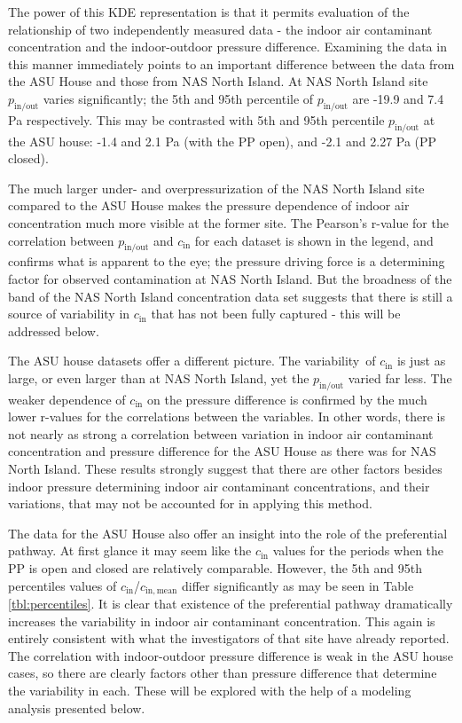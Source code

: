 \documentclass[preprint,12pt]{elsarticle}
\begin{document}
The power of this KDE representation is that it permits evaluation of the relationship of two independently measured data - the indoor air contaminant concentration and the indoor-outdoor pressure difference.
Examining the data in this manner immediately points to an important difference between the data from the ASU House and those from NAS North Island.
At NAS North Island site $p_\mathrm{in/out}$ varies significantly; the 5th and 95th percentile of $p_\mathrm{in/out}$ are -19.9 and 7.4 Pa respectively.
This may be contrasted with 5th and 95th percentile $p_\mathrm{in/out}$ at the ASU house: -1.4 and 2.1 Pa (with the PP open), and -2.1 and 2.27 Pa (PP closed).\par

The much larger under- and overpressurization of the NAS North Island site compared to the ASU House makes the pressure dependence of indoor air concentration much more visible at the former site.
The Pearson’s r-value for the correlation between $p_\mathrm{in/out}$ and $c_\mathrm{in}$ for each dataset is shown in the legend, and confirms what is apparent to the eye; the pressure driving force is a determining factor for observed contamination at NAS North Island.
But the broadness of the band of the NAS North Island concentration data set suggests that there is still a source of variability in $c_\mathrm{in}$ that has not been fully captured - this will be addressed below.\par

The ASU house datasets offer a different picture.
The variability of $c_\mathrm{in}$ is just as large, or even larger than at NAS North Island, yet the $p_\mathrm{in/out}$ varied far less.
The weaker dependence of $c_\mathrm{in}$ on the pressure difference is confirmed by the much lower r-values for the correlations between the variables.
In other words, there is not nearly as strong a correlation between variation in indoor air contaminant concentration and pressure difference for the ASU House as there was for NAS North Island.
These results strongly suggest that there are other factors besides indoor pressure determining indoor air contaminant concentrations, and their variations, that may not be accounted for in applying this method.\par

The data for the ASU House also offer an insight into the role of the preferential pathway.
At first glance it may seem like the $c_\mathrm{in}$ values for the periods when the PP is open and closed are relatively comparable.
However, the 5th and 95th percentiles values of $c_\mathrm{in}$/$c_\mathrm{in,mean}$ differ significantly as may be seen in Table \ref{tbl:percentiles}.
It is clear that existence of the preferential pathway dramatically increases the variability in indoor air contaminant concentration.
This again is entirely consistent with what the investigators of that site have already reported\cite{guo_identification_2015}.
The correlation with indoor-outdoor pressure difference is weak in the ASU house cases, so there are clearly factors other than pressure difference that determine the variability in each.
These will be explored with the help of a modeling analysis presented below.\par
\end{document}
